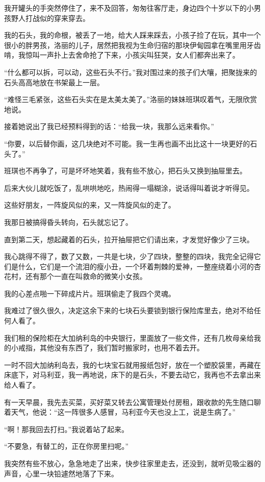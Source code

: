 \par 我开罐头的手突然停住了，来不及回答，匆匆往客厅走，身边四个十岁以下的小男孩野人打战似的穿来穿去。
\par 我的石头，我的命根，被丢了一地，给大人踩来踩去，小孩子捡了在玩，其中一个很小的胖男孩，洛丽的儿子，居然把我视为生命归宿的那块伊甸园拿在嘴里用牙齿啃，我惊叫一声扑上去舍命抢了下来，小孩尖叫狂哭，女人们都奔出来了。
\par “什么都可以拆，可以动，这些石头不行。”我对围过来的孩子们大嚷，把聚拢来的石头高高地放在书架最上一层。
\par “难怪三毛紧张，这些石头实在是太美太美了。”洛丽的妹妹班琪叹着气，无限欣赏地说。
\par 接着她说出了我已经预料得到的话：“给我一块，我那么远来看你。”
\par “你要，以后替你画，这几块绝对不可能。我一生再也画不出比这十一块更好的石头了。”
\par 班琪也不再争了，可是坏坏地笑着，我有些不放心，把石头又换到抽屉里去。
\par 后来大伙儿就吃饭了，乱哄哄地吃，热闹得一塌糊涂，说话得叫着说才听得见。
\par 这些好朋友，一阵旋风似的来，又一阵旋风似的走了。
\par 我那日被搞得昏头转向，石头就忘记了。
\par 直到第二天，想起藏着的石头，拉开抽屉把它们请出来，才发觉好像少了三块。
\par 我心跳得不得了，数了又数，一共是七块，少了四块，整整的四块，我完全记得它们是什么，它们是一个流泪的瘦小丑，一个环着荆棘的爱神，一整座绕着小河的杏花村，还有那个一直在叫救命的微笑小女孩。
\par 我的心差点啪一下碎成片片。班琪偷走了我四个灵魂。
\par 我难过了很久很久，决定这余下来的七块石头要锁到银行保险库里去，绝对不给任何人看了。
\par 我们租的保险柜在大加纳利岛的中央银行，里面放了一些文件，还有几枚母亲给我的小戒指，其他没有东西了，我们暂时搬家时，也用不着去开。
\par 一时不回大加纳利岛去，我的七块宝石就用报纸包好，放在一个塑胶袋里，再藏在床底下，对马利亚，我一再地说，床下的是石头，不要去动它，我再也不去拿出来给人看了。
\par 有一天早晨，我先去买菜，买好菜又转去公寓管理处付房租，跟收款的先生随口聊着天气，他说：“这一阵很多人感冒，马利亚今天也没上工，说是生病了。”
\par “啊！那我回去打扫。”我说着站了起来。
\par “不要急，有替工的，正在你房里扫呢。”
\par 我突然有些不放心，急急地走了出来，快步往家里走去，还没到，就听见吸尘器的声音，心里一块铅遽然地落了下来。
